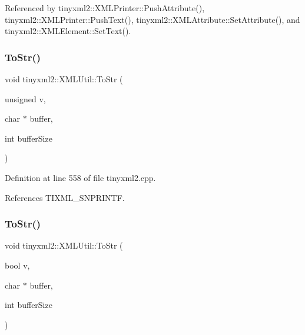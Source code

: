 Referenced by tinyxml2\+::\+X\+M\+L\+Printer\+::\+Push\+Attribute(), tinyxml2\+::\+X\+M\+L\+Printer\+::\+Push\+Text(), tinyxml2\+::\+X\+M\+L\+Attribute\+::\+Set\+Attribute(), and tinyxml2\+::\+X\+M\+L\+Element\+::\+Set\+Text().

\mbox{\label{classtinyxml2_1_1_x_m_l_util_ac00c2e52c1c36dab3ff41d86a9bf60f9}} 
\subsubsection{To\+Str()\hspace{0.1cm}{\footnotesize\ttfamily [2/6]}}
{\footnotesize\ttfamily void tinyxml2\+::\+X\+M\+L\+Util\+::\+To\+Str (\begin{DoxyParamCaption}\item[{unsigned}]{v,  }\item[{char $\ast$}]{buffer,  }\item[{int}]{buffer\+Size }\end{DoxyParamCaption})\hspace{0.3cm}{\ttfamily [static]}}



Definition at line 558 of file tinyxml2.\+cpp.



References T\+I\+X\+M\+L\+\_\+\+S\+N\+P\+R\+I\+N\+TF.

\mbox{\label{classtinyxml2_1_1_x_m_l_util_adba0718527ae9e80f663a71ea325cb11}} 
\subsubsection{To\+Str()\hspace{0.1cm}{\footnotesize\ttfamily [3/6]}}
{\footnotesize\ttfamily void tinyxml2\+::\+X\+M\+L\+Util\+::\+To\+Str (\begin{DoxyParamCaption}\item[{bool}]{v,  }\item[{char $\ast$}]{buffer,  }\item[{int}]{buffer\+Size }\end{DoxyParamCaption})\hspace{0.3cm}{\ttfamily [static]}}



